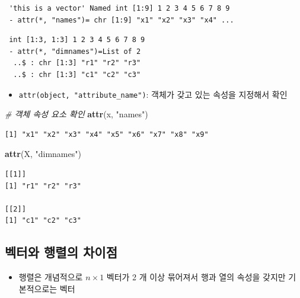 \documentclass[
  11pt,
]{krantz}
\newenvironment{Shaded}{\begin{snugshade}}{\end{snugshade}}
\newcommand{\CommentTok}[1]{\textcolor[rgb]{0.37,0.37,0.37}{\textit{#1}}}
\newcommand{\KeywordTok}[1]{\textcolor[rgb]{0.27,0.27,0.27}{\textbf{#1}}}
\newcommand{\NormalTok}[1]{#1}
\newcommand{\StringTok}[1]{\textcolor[rgb]{0.5,0.5,0.5}{#1}}
\providecommand{\tightlist}{%
  \setlength{\itemsep}{0pt}\setlength{\parskip}{0pt}}
\begin{document}
\begin{verbatim}
 'this is a vector' Named int [1:9] 1 2 3 4 5 6 7 8 9
 - attr(*, "names")= chr [1:9] "x1" "x2" "x3" "x4" ...
\end{verbatim}

\begin{verbatim}
 int [1:3, 1:3] 1 2 3 4 5 6 7 8 9
 - attr(*, "dimnames")=List of 2
  ..$ : chr [1:3] "r1" "r2" "r3"
  ..$ : chr [1:3] "c1" "c2" "c3"
\end{verbatim}

\normalsize

\begin{itemize}
\tightlist
\item
  \texttt{attr(object,\ "attribute\_name")}: 객체가 갖고 있는 속성을 지정해서 확인
\end{itemize}

\footnotesize

\begin{Shaded}
\begin{Highlighting}[]
\CommentTok{# 객체 속성 요소 확인}
\KeywordTok{attr}\NormalTok{(x, }\StringTok{"names"}\NormalTok{)}
\end{Highlighting}
\end{Shaded}

\begin{verbatim}
[1] "x1" "x2" "x3" "x4" "x5" "x6" "x7" "x8" "x9"
\end{verbatim}

\begin{Shaded}
\begin{Highlighting}[]
\KeywordTok{attr}\NormalTok{(X, }\StringTok{"dimnames"}\NormalTok{)}
\end{Highlighting}
\end{Shaded}

\begin{verbatim}
[[1]]
[1] "r1" "r2" "r3"

[[2]]
[1] "c1" "c2" "c3"
\end{verbatim}

\normalsize

\hypertarget{vec-mat-diff}{%
\subsection{벡터와 행렬의 차이점}\label{vec-mat-diff}}

\begin{itemize}
\tightlist
\item
  행렬은 개념적으로 \(n \times 1\) 벡터가 2 개 이상 묶어져서 행과 열의 속성을 갖지만 기본적으로는 벡터
\end{itemize}
\end{document}
